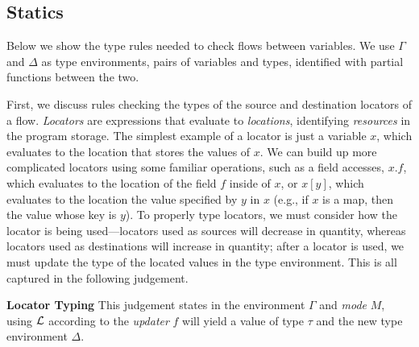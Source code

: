 \documentclass[nonacm, dvipsnames, sigconf]{acmart}
\begin{document}
\subsection{Statics}
Below we show the type rules needed to check flows between variables.
We use $\Gamma$ and $\Delta$ as type environments, pairs of variables and types, identified with partial functions between the two.

First, we discuss rules checking the types of the source and destination locators of a flow.
\emph{Locators} are expressions that evaluate to \emph{locations}, identifying \emph{resources} in the program storage.
The simplest example of a locator is just a variable $x$, which evaluates to the location that stores the values of $x$.
We can build up more complicated locators using some familiar operations, such as a field accesses, $x.f$, which evaluates to the location of the field $f$ inside of $x$, or $x[y]$, which evaluates to the location the value specified by $y$ in $x$ (e.g., if $x$ is a map, then the value whose key is $y$).
To properly type locators, we must consider how the locator is being used---locators used as sources will decrease in quantity, whereas locators used as destinations will increase in quantity; after a locator is used, we must update the type of the located values in the type environment.
This is all captured in the following judgement.

 \textbf{Locator Typing}
This judgement states in the environment $\Gamma$ and \emph{mode} $M$, using $\mathcal{L}$ according to the \emph{updater} $f$ will yield a value of type $\tau$ and the new type environment $\Delta$.
\end{document}
